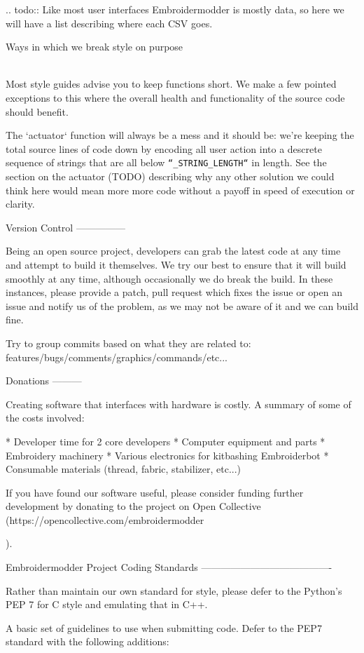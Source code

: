\documentclass[a4paper]{report}
\begin{document}
{{{{{{{.. todo::
   Like most user interfaces Embroidermodder is mostly data,
   so here we will have a list describing where each CSV goes.

Ways in which we break style on purpose
~~~~~~~~~~~~~~~~~~~~~~~~~~~~~~~~~~~~~~~

Most style guides advise you to keep functions short. We make a few pointed
exceptions to this where the overall health and functionality of the source code should benefit.

The `actuator` function will always be a mess and it should be: we're keeping
the total source lines of code down by encoding all user action into a descrete
sequence of strings that are all below \texttt{``_STRING_LENGTH``} in length. See
the section on the actuator (TODO) describing why any other solution we could
think  here would mean more more code without a payoff in speed of execution or
clarity.

Version Control
---------------

Being an open source project, developers can grab the latest code at any time and attempt to build it themselves. We try our best to ensure that it will build smoothly at any time, although occasionally we do break the build. In these instances, please provide a patch, pull request which fixes the issue or open an issue and notify us of the problem, as we may not be aware of it and we can build fine.

Try to group commits based on what they are related to: features/bugs/comments/graphics/commands/etc...

Donations
---------

Creating software that interfaces with hardware is costly. A summary of some of the costs involved:

* Developer time for 2 core developers
* Computer equipment and parts
* Embroidery machinery
* Various electronics for kitbashing Embroiderbot
* Consumable materials (thread, fabric, stabilizer, etc...)

If you have found our software useful, please consider funding further development by donating to the project on Open Collective
(https://opencollective.com/embroidermodder}).

Embroidermodder Project Coding Standards
----------------------------------------

Rather than maintain our own standard for style, please defer to
the Python's PEP 7 \citep{pep7} for C style and emulating that in C++.

A basic set of guidelines to use when submitting code. Defer to the PEP7 standard with the following additions:

}}}}}}
\end{document}
